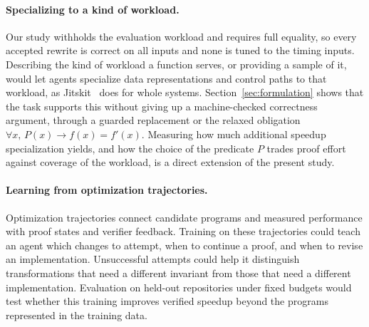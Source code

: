\documentclass{article}
\begin{document}
\paragraph{Specializing to a kind of workload.}
Our study withholds the evaluation workload and requires full equality, so every accepted rewrite is correct on all inputs and none is tuned to the timing inputs.
Describing the kind of workload a function serves, or providing a sample of it, would let agents specialize data representations and control paths to that workload, as Jitskit~\citep{liu2026time} does for whole systems.
Section~\ref{sec:formulation} shows that the task supports this without giving up a machine-checked correctness argument, through a guarded replacement or the relaxed obligation $\forall x,\, P(x) \rightarrow f(x)=f'(x)$.
Measuring how much additional speedup specialization yields, and how the choice of the predicate $P$ trades proof effort against coverage of the workload, is a direct extension of the present study.

\paragraph{Learning from optimization trajectories.}
Optimization trajectories connect candidate programs and measured performance with proof states and verifier feedback.
Training on these trajectories could teach an agent which changes to attempt, when to continue a proof, and when to revise an implementation.
Unsuccessful attempts could help it distinguish transformations that need a different invariant from those that need a different implementation.
Evaluation on held-out repositories under fixed budgets would test whether this training improves verified speedup beyond the programs represented in the training data.
\end{document}
